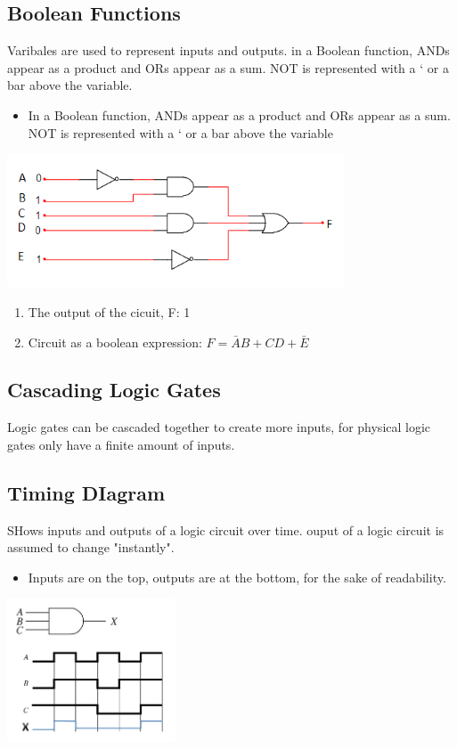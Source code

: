 \documentclass[a4paper,12pt]{article}
\begin{document}
    \subsection*{Boolean Functions}
        Varibales are used to represent inputs and outputs. in a Boolean function, ANDs appear as a product and ORs appear as a sum. NOT is represented with a ‘ or a bar above the variable.
        \begin{itemize}
            \item In a Boolean function, ANDs appear as a product and ORs appear as a sum. NOT is represented with a ‘ or a bar above the variable
        \end{itemize}
        \includegraphics*[width=10cm]{circuit1.png}
        \begin{enumerate}
            \item The output of the cicuit, F: 1
            \item Circuit as a boolean expression: $F=\bar{A}B+CD+\bar{E}$
        \end{enumerate}

        \subsection*{Cascading Logic Gates}
            Logic gates can be cascaded together to create more inputs, for physical logic gates only have a finite amount of inputs.

        \subsection*{Timing DIagram}
            SHows inputs and outputs of a logic circuit over time. ouput of a logic circuit is assumed to change "instantly".
            \begin{itemize}
                \item Inputs are on the top, outputs are at the bottom, for the sake of readability.
            \end{itemize}
            \begin{center}\includegraphics*[width=5cm]{Timing Diagram.png}\end{center}
\end{document}
